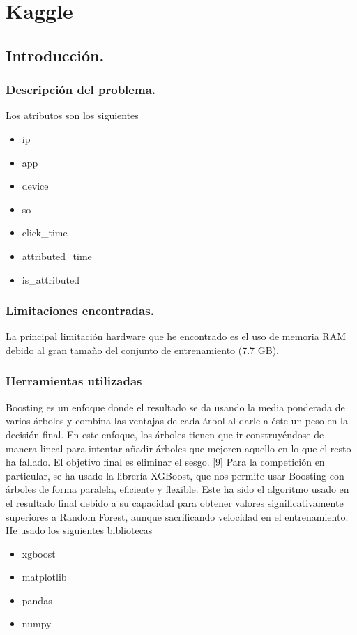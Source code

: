 \chapter[Kaggle]{Kaggle}
\section{Introducción.}
\subsection{Descripción del problema.}
Los atributos son los siguientes
\begin{itemize}
	\item ip
	\item app
	\item device
	\item so
	\item click\_time
	\item attributed\_time
	\item is\_attributed
\end{itemize}
\subsection{Limitaciones encontradas.}
La principal limitación hardware que he encontrado es el uso de memoria RAM debido al gran tamaño del conjunto de entrenamiento (7.7 GB).
\subsection{Herramientas utilizadas}
Boosting es un enfoque donde el resultado se da usando la media
ponderada de varios árboles y combina las ventajas de cada árbol al darle
a éste un peso en la decisión final. En este enfoque, los árboles tienen
que ir construyéndose de manera lineal para intentar añadir árboles que
mejoren aquello en lo que el resto ha fallado. El objetivo final es eliminar el
sesgo. [9]
Para la competición en particular, se ha usado la librería XGBoost,
que nos permite usar Boosting con árboles de forma paralela, eficiente y
flexible. Este ha sido el algoritmo usado en el resultado final debido a su
capacidad para obtener valores significativamente superiores a Random
Forest, aunque sacrificando velocidad en el entrenamiento.
He usado los siguientes bibliotecas
\begin{itemize}
	\item xgboost
	\item matplotlib
	\item pandas
	\item numpy
\end{itemize}
